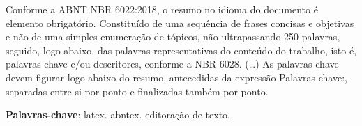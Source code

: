 \begin{resumoumacoluna}
  Conforme a ABNT NBR 6022:2018, o resumo no idioma do documento é elemento obrigatório. 
  Constituído de uma sequência de frases concisas e objetivas e não de uma 
  simples enumeração de tópicos, não ultrapassando 250 palavras, seguido, logo 
  abaixo, das palavras representativas do conteúdo do trabalho, isto é, 
  palavras-chave e/ou descritores, conforme a NBR 6028. (\ldots) As 
  palavras-chave devem figurar logo abaixo do resumo, antecedidas da expressão 
  Palavras-chave:, separadas entre si por ponto e finalizadas também por ponto.
  
  \vspace{\onelineskip}
  
  \noindent
  \textbf{Palavras-chave}: latex. abntex. editoração de texto.
 \end{resumoumacoluna}